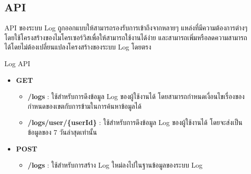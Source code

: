 \subsection{API}

\ifenglish
\else
API ของระบบ Log ถูกออกแบบให้สามารถรองรับการเข้าถึงจากหลายๆ แหล่งที่มีความต้องการต่างๆ โดยใช้โครงสร้างของไมโครเซอร์วิสเพื่อให้สามารถใช้งานได้ง่าย และสามารถเพิ่มหรือลดความสามารถได้โดยไม่ต้องเปลี่ยนแปลงโครงสร้างของระบบ Log โดยตรง

Log API
\begin{itemize}
    \item \textbf{GET}
    \begin{itemize}
        \item \textbf{/logs} : ใช้สำหรับการดึงข้อมูล Log ของผู้ใช้งานได้ โดยสามารถกำหนดเงื่อนไขเรื่องของกำหนดของเขตกับการข้ามในการค้นหาข้อมูลได้
        \item \textbf{/logs/user/\{userId\}} : ใช้สำหรับการดึงข้อมูล Log ของผู้ใช้งานได้ โดยจะส่งเป็นข้อมูลของ 7 วันล่าสุดเท่านั้น
    \end{itemize}
    \item \textbf{POST}
    \begin{itemize}
        \item \textbf{/logs} : ใช้สำหรับการสร้าง Log ใหม่ลงไปในฐานข้อมูลของระบบ Log
    \end{itemize}
\end{itemize}
\fi